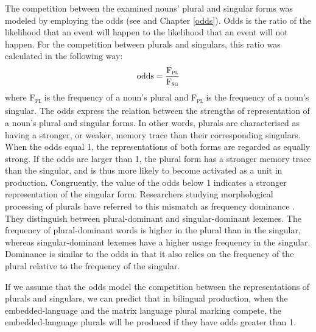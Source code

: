 The competition between the examined nouns’ plural and singular forms was modeled by employing the odds (see \citealt[119]{fahrmeir-etal-2007} and Chapter \ref{odds}). Odds is the ratio of the likelihood that an event will happen to the likelihood that an event will not happen. For the competition between plurals and singulars, this ratio was calculated in the following way: \[ \text{odds} = \frac{\text{F\textsubscript{\textsc{pl}}}}{\text{F\textsubscript{\textsc{sg}}}}\]
where F\textsubscript{\textsc{pl}} is the frequency of a noun’s plural and F\textsubscript{\textsc{pl}} is the frequency of a noun’s singular. The odds express the relation between the strengths of representation of a noun’s plural and singular forms. In other words, plurals are characterised as having a stronger, or weaker, memory trace than their corresponding singulars. When the odds equal 1, the representations of both forms are regarded as equally strong. If the odds are larger than 1, the plural form has a stronger memory trace than the singular, and is thus more likely to become activated as a unit in production. Congruently, the value of the odds below 1 indicates a stronger representation of the singular form. Researchers studying morphological processing of plurals have referred to this mismatch as frequency dominance \citep{baayen-dijkstra-schreuder}. They distinguish between plural-dominant and singular-dominant lexemes. The frequency of plural-dominant words is higher in the plural than in the singular, whereas singular-dominant lexemes have a higher usage frequency in the singular. Dominance is similar to the odds in that it also relies on the frequency of the plural relative to the frequency of the singular.

If we assume that the odds model the competition between the representations of plurals and singulars, we can predict that in bilingual production, when the embedded-language and the matrix language plural marking compete, the embedded-language plurals will be produced if they have odds greater than 1.

